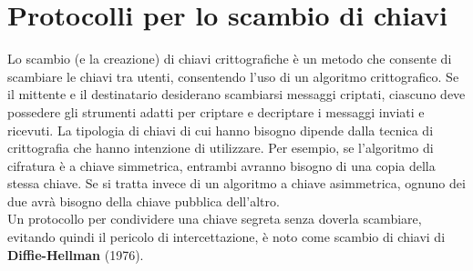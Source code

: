\chapter{Protocolli per lo scambio di chiavi}
Lo scambio (e la creazione) di chiavi crittografiche è un metodo che consente di scambiare le chiavi tra utenti, consentendo l'uso di un algoritmo crittografico. Se il mittente e il destinatario desiderano scambiarsi messaggi criptati, ciascuno deve possedere gli strumenti adatti per criptare e decriptare i messaggi inviati e ricevuti. La tipologia di chiavi di cui hanno bisogno dipende dalla tecnica di crittografia che hanno intenzione di utilizzare. Per esempio, se l'algoritmo di cifratura è a chiave simmetrica, entrambi avranno bisogno di una copia della stessa chiave. Se si tratta invece di un algoritmo a chiave asimmetrica, ognuno dei due avrà bisogno della chiave pubblica dell'altro.\\
Un protocollo per condividere una chiave segreta senza doverla scambiare, evitando quindi il pericolo di intercettazione, è noto come scambio di chiavi di \textbf{Diffie-Hellman} (1976).

